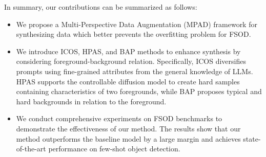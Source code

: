 In summary, our contributions can be summarized as follows: 
\begin{itemize}
    \item We propose a Multi-Perspective Data Augmentation (MPAD) framework for synthesizing data which better prevents the overfitting problem for FSOD.
    \item We introduce ICOS, HPAS, and BAP methods to enhance synthesis by considering foreground-background relation. Specifically, ICOS diversifies prompts using fine-grained attributes from the general knowledge of LLMs. HPAS supports the controllable diffusion model to create hard samples containing characteristics of two foregrounds, while BAP proposes typical and hard backgrounds in relation to the foreground.
    \item We conduct comprehensive experiments on FSOD benchmarks to demonstrate the effectiveness of our method. The results show that our method outperforms the baseline model by a large margin and achieves state-of-the-art performance on few-shot object detection.
\end{itemize}